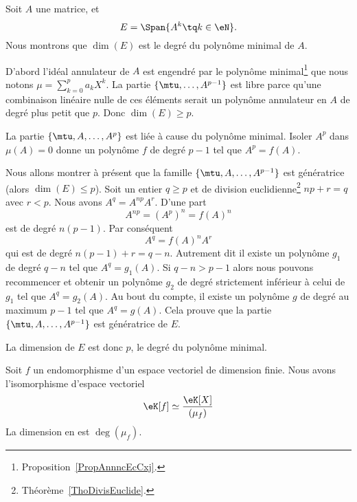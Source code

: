 \begin{example}
    Soit \( A\) une matrice, et
    \begin{equation}
        E=\Span\{A^k\tq k\in \eN \}.
    \end{equation}
    Nous montrons que \( \dim(E)\) est le degré du polynôme minimal de \( A\).

    D'abord l'idéal annulateur de \( A\) est engendré par le polynôme minimal\footnote{Proposition~\ref{PropAnnncEcCxj}.} que nous notons
        $\mu=\sum_{k=0}^pa_kX^k$.
    La partie \( \{ \mtu,\ldots, A^{p-1} \}\) est libre parce qu'une combinaison linéaire nulle de ces éléments serait un polynôme annulateur en \( A\) de degré plus petit que \( p\). Donc \( \dim(E)\geq p\).

    La partie \( \{ \mtu,A,\ldots, A^p \}\) est liée à cause du polynôme minimal. Isoler \( A^p\) dans \( \mu(A)=0\) donne un polynôme \( f\) de degré \( p-1\) tel que \( A^p=f(A)\).

    Nous allons montrer à présent que la famille \( \{ \mtu,A,\ldots, A^{p-1} \}\) est génératrice (alors \( \dim(E)\leq p\)). Soit un entier \( q\geq p\) et de division euclidienne\footnote{Théorème~\ref{ThoDivisEuclide}.} \( np+r=q\) avec \( r<p\). Nous avons \( A^q=A^{np}A^r\). D'une part
    \begin{equation}
        A^{np}=(A^p)^n=f(A)^n
    \end{equation}
    est de degré \( n(p-1)\). Par conséquent
    \begin{equation}
        A^q=f(A)^nA^r
    \end{equation}
    qui est de degré \( n(p-1)+r=q-n\). Autrement dit il existe un polynôme \( g_1\) de degré \( q-n\) tel que \( A^q=g_1(A)\). Si \( q-n>p-1\) alors nous pouvons recommencer et obtenir un polynôme \( g_2\) de degré strictement inférieur à celui de \( g_1\) tel que \( A^q=g_2(A)\). Au bout du compte, il existe un polynôme \( g\) de degré au maximum \( p-1\) tel que \( A^q=g(A)\). Cela prouve que la partie \( \{ \mtu,A,\ldots, A^{p-1} \}\) est génératrice de \( E\).

    La dimension de \( E\) est donc \( p\), le degré du polynôme minimal.
\end{example}

\begin{proposition}     \label{PropooCFZDooROVlaA}
    Soit \( f\) un endomorphisme d'un espace vectoriel de dimension finie. Nous avons l'isomorphisme d'espace vectoriel
    \begin{equation}
        \eK[f]\simeq\frac{ \eK[X] }{ (\mu_f) }
    \end{equation}
    La dimension en est \( \deg(\mu_f)\).
\end{proposition}

